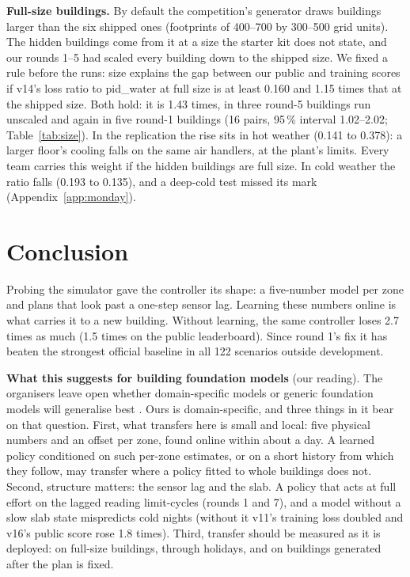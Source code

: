 \documentclass{article}
\begin{document}
\textbf{Full-size buildings.} By default the competition's generator draws buildings larger than the six shipped
ones (footprints of 400--700 by 300--500 grid units). The hidden buildings come from it at a size the starter kit
does not state, and our rounds 1--5 had scaled every building down to the shipped size. We fixed a rule before the
runs: size explains the gap between our public and training scores if v14's loss ratio to pid\_water at full size is
at least 0.160 and 1.15 times that at the shipped size. Both hold: it is 1.43 times, in three round-5 buildings run
unscaled and again in five round-1 buildings (16 pairs, 95\,\% interval 1.02--2.02; Table~\ref{tab:size}). In the replication the
rise sits in hot weather (0.141 to 0.378): a larger floor's cooling falls on the same air handlers, at the plant's
limits. Every team carries this weight if the hidden buildings are full size. In cold weather the ratio falls (0.193
to 0.135), and a deep-cold test missed its mark (Appendix~\ref{app:monday}).

\section{Conclusion}\label{sec:concl}
Probing the simulator gave the controller its shape: a five-number model per zone and plans that look past a one-step sensor lag. Learning
these numbers online is what carries it to a new building. Without learning, the same controller loses 2.7 times as
much (1.5 times on the public leaderboard). Since round 1's fix it has beaten the strongest official baseline in all
122 scenarios outside development.

\textbf{What this suggests for building foundation models} (our reading). The organisers leave open whether
domain-specific models or generic foundation models will generalise best \cite{goldfeder2026smart}. Ours is
domain-specific, and three things in it bear on that question. First, what transfers here is small and
local: five physical numbers and an offset per zone, found online within about a day. A learned policy conditioned on
such per-zone estimates, or on a short history from which they follow, may transfer where a policy fitted to whole
buildings does not. Second, structure matters: the sensor lag and the slab. A
policy that acts at full effort on the lagged reading limit-cycles (rounds 1 and 7), and a model without a slow slab
state mispredicts cold nights (without it v11's training loss doubled and v16's public score rose 1.8 times). Third,
transfer should be measured as it is deployed: on full-size buildings, through holidays, and on buildings generated
after the plan is fixed.
\end{document}
